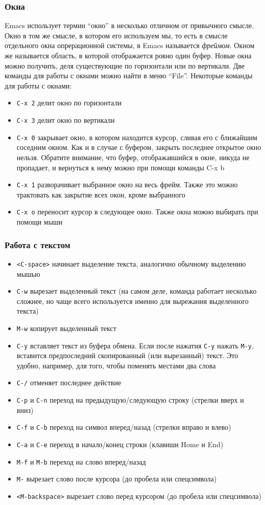 \documentclass[a4paper, 12pt, titlepage, twoside]{article}
\begin{document}
\subsubsection{Окна}
Emacs использует термин ``окно'' в несколько отличном от привычного смысле. Окно в том же смысле, в котором его используем мы, то есть в смысле отдельного окна опрерационной системы, в Emacs называется \textit{фреймом}. Окном же называется область, в которой отображается ровно один буфер. Новые окна можно получить, деля существующие по горизонтали или по вертикали. Две команды для работы с окнами можно найти в меню ``File''. Некоторые команды для работы с окнами:
\begin{itemize}
\item \verb|C-x 2| делит окно по горизонтали
\item \verb|C-x 3| делит окно по вертикали
\item \verb|C-x 0| закрывает окно, в котором находится курсор, сливая его с ближайшим соседним окном. Как и в случае с буфером, закрыть последнее открытое окно нельзя. Обратите внимание, что буфер, отображавшийся в окне, никуда не пропадает, и вернуться к нему можно при помощи команды C-x b
\item \verb|C-x 1| разворачивает выбранное окно на весь фрейм. Также это можно трактовать как закрытие всех окон, кроме выбранного
\item \verb|C-x o| переносит курсор в следующее окно. Также окна можно выбирать при помощи мыши
\end{itemize}
\subsubsection{Работа с текстом}
\begin{itemize}
\item \verb|<C-space>| начинает выделение текста, аналогично обычному выделению мышью
\item \verb|C-w| вырезает выделенный текст (на самом деле, команда работает несколько сложнее, но чаще всего используется именно для вырежания выделенного текста)
\item \verb|M-w| копирует выделенный текст
\item \verb|C-y| вставляет текст из буфера обмена. Если после нажатия \verb|C-y| нажать \verb|M-y|, вставится предпоследний скопированный (или вырезанный) текст. Это удобно, например, для того, чтобы поменять местами два слова
\item \verb|C-/| отменяет последнее действие
\item \verb|C-p| и \verb|C-n| переход на предыдущую/следующую строку (стрелки вверх и вниз)
\item \verb|C-f| и \verb|C-b| переход на символ вперед/назад (стрелки вправо и влево)
\item \verb|C-a| и \verb|C-e| переход в начало/конец строки (клавиши Home и End)
\item \verb|M-f| и \verb|M-b| переход на слово вперед/назад
\item \verb|M-| вырезает слово после курсора (до пробела или спецсимвола)
\item \verb|<M-backspace>| вырезает слово перед курсором (до пробела или спецсимвола)
\end{itemize}
\end{document}
